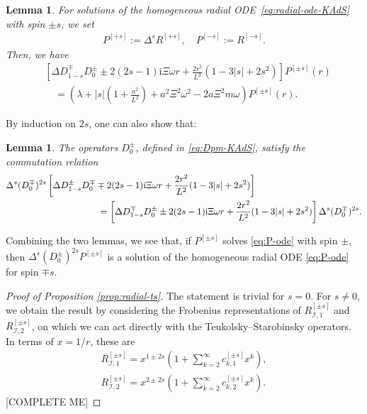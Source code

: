 \documentclass[11pt]{article}
\newtheorem{lemma}[proposition]{Lemma}
\newcommand{\ii}{\mathrm{i}}
\newcommand{\cI}{\mathcal I}
\numberwithin{equation}{section}
\begin{document}
\begin{lemma}\label{lem:P-ode-KAdS} For solutions of the homogeneous radial ODE~\eqref{eq:radial-ode-KAdS} with spin $\pm s$, we set
\begin{align*}
P^{[+ s]}:=\Delta^s R^{[+s]}, \quad P^{[-s]}:=R^{[-s]}.
\end{align*}
Then, we have
\begin{equation}\label{eq:P-ode-KAdS}
\begin{split}
&\left[\Delta D^{\mp}_{1-s}D^{\pm}_0\pm2(2s-1)\ii\Xi\omega r+\frac{2r^2}{L^2}(1-3|s|+2s^2)\right]P^{[\pm s]}(r)\\
&\quad=\left(\lambda+|s|\left(1+\frac{a^2}{L^2}\right)+a^2\Xi^2\omega^2-2a\Xi^2m\omega\right)P^{[\pm s]}(r).
\end{split}
\end{equation}
\end{lemma}

By induction on $2s$, one can also show that:

\begin{lemma}\label{lem:radial-commutation-KAdS}
The operators $D^{\pm}_0$, defined in \eqref{eq:Dpm-KAdS}, satisfy the commutation relation
\begin{align}\label{eq:radial-commutation-KAdS}
&\Delta^s(D^{\mp}_0)^{2s}
\left[\Delta D^{\pm}_{1-s}D^{\mp}_0\mp2(2s-1)\ii\Xi\omega r+\frac{2r^2}{L^2}(1-3|s|+2s^2)\right]
\notag\\
&\hspace{35mm}=
\left[\Delta D^{\mp}_{1-s}D^{\pm}_0\pm2(2s-1)\ii\Xi\omega r+\frac{2r^2}{L^2}(1-3|s|+2s^2)\right]
\Delta^s(D^{\mp}_0)^{2s}.
\end{align}
\end{lemma}

Combining the two lemmas, we see that, if $P^{[\pm s]}$ solves \eqref{eq:P-ode} with spin $\pm$, then $\Delta^s(D^{\pm}_0)^{2s}P^{[\pm s]}$ is a solution of the homogeneous radial ODE \eqref{eq:P-ode} for spin $\mp s$.

\begin{proof}[Proof of Proposition \ref{prop:radial-ts}]
The statement is trivial for $s=0$. For $s\neq0$, we obtain the result by considering  the Frobenius representations of $R^{[\pm s]}_{\cI,1}$ and $R^{[\pm s]}_{\cI,2}$, on which we can act directly with the Teukolsky--Starobinsky operators. In terms of $x=1/r$, these are
\begin{align*}
R^{[\pm s]}_{\cI,1}=x^{1\pm 2s}\left(1+\sum_{k=2}^\infty c_{k,1}^{[\pm s]}x^k\right),\\
R^{[\pm s]}_{\cI,2}=x^{2\pm 2s}\left(1+\sum_{k=2}^\infty c_{k,2}^{[\pm s]}x^k\right).
\end{align*}
[COMPLETE ME]
\end{proof}
\end{document}
